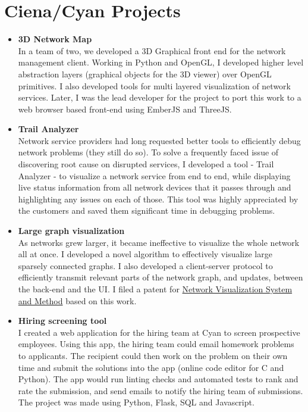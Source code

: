 \documentclass[line, 11pt]{res}
\renewenvironment{resume}{\begingroup}{\endgroup}
\begin{document}
\begin{resume}
\section{Ciena/Cyan Projects}
    \begin{itemize}
        \item \textbf{3D Network Map}\\
In a team of two, we developed a 3D Graphical front end for the network management client. Working in Python and OpenGL, I developed higher level abstraction layers (graphical objects for the 3D viewer) over OpenGL primitives. I also developed tools for multi layered visualization of network services. Later, I was the lead developer for the project to port this work to a web browser based front-end using EmberJS and ThreeJS.

        \item \textbf{Trail Analyzer}\\
Network service providers had long requested better tools to efficiently debug network problems (they still do so). To solve a frequently faced issue of discovering root cause on disrupted services, I developed a tool - Trail Analyzer - to visualize a network service from end to end, while displaying live status information from all network devices that it passes through and highlighting any issues on each of those. This tool was highly appreciated by the customers and saved them significant time in debugging problems.

        \item \textbf{Large graph visualization}\\
As networks grew larger, it became ineffective to visualize the whole network all at once. I developed a novel algorithm to effectively visualize large sparsely connected graphs. I also developed a client-server protocol to efficiently transmit relevant parts of the network graph, and updates, between the back-end and the UI. I filed a patent for \href{https://patentscope.wipo.int/search/en/detail.jsf?docId=WO2015041751&tab=PCTBIBLIO}{Network Visualization System and Method} based on this work.

        \item \textbf{Hiring screening tool}\\
    I created a web application for the hiring team at Cyan to screen prospective employees. Using this app, the hiring team could email homework problems to applicants. The recipient could then work on the problem on their own time and submit the solutions into the app (online code editor for C and Python). The app would run linting checks and automated tests to rank and rate the submission, and send emails to notify the hiring team of submissions. The project was made using Python, Flask, SQL and Javascript.


\end{itemize}
\end{resume}
\end{document}
